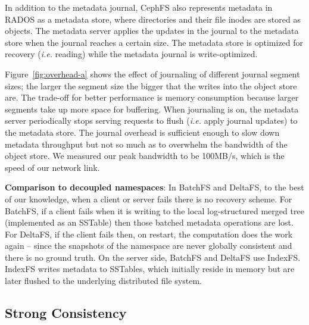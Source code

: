 In addition to the metadata journal, CephFS also represents metadata in RADOS
as a metadata store, where directories and their file inodes are stored as
objects.  The metadata server applies the updates in the journal to the
metadata store when the journal reaches a certain size. The metadata store is
optimized for recovery ({\it i.e.} reading) while the metadata journal is
write-optimized.


Figure~\ref{fig:overhead-a} shows the
effect of journaling of different journal segment sizes; the larger the segment
size the bigger that the writes into the object store are. The trade-off for
better performance is memory consumption because larger segments take up
more space for buffering. When journaling is on, 
the metadata server periodically stops serving requests to flush ({\it i.e.}
apply journal updates) to the metadata store.  The journal overhead is
sufficient enough to slow down metadata throughput but not so much as to
overwhelm the bandwidth of the object store. We measured our peak bandwidth to
be 100MB/s, which is the speed of our network link.

\textbf{Comparison to decoupled namespaces}: In BatchFS and DeltaFS,
to the best of our knowledge, when a client or server fails there is no recovery
scheme. For BatchFS, if a client fails when it is writing to the local
log-structured merged tree (implemented as an SSTable) then those batched
metadata operations are lost. For DeltaFS, if the client fails then, on restart,
the computation does the work again -- since the snapshots of the namespace are
never globally consistent and there is no ground truth.  On the server side,
BatchFS and DeltaFS use IndexFS. IndexFS writes metadata to SSTables, which
initially reside in memory but are later flushed to the underlying
distributed file system.

\subsection{Strong Consistency}
\label{sec:strong-consistency}

